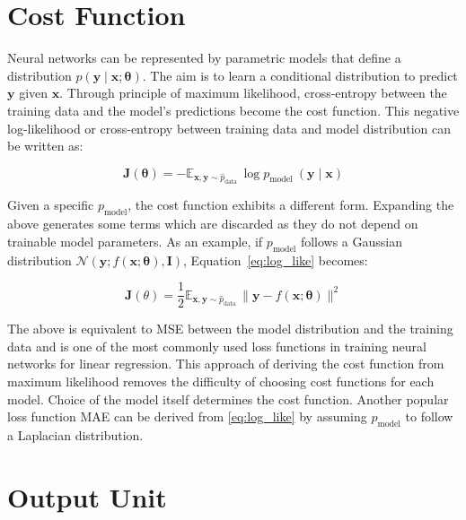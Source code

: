 \section{Cost Function}

Neural networks can be represented by parametric models that define a distribution $p(\boldsymbol{y} \mid \boldsymbol{x} ; \boldsymbol{\theta})$. The aim is to learn a conditional distribution to predict $\boldsymbol{y}$ given $\boldsymbol{x}$. Through principle of maximum likelihood, cross-entropy between the training data and the model's predictions become the cost function. This negative log-likelihood or cross-entropy between training data and model distribution can be written as:

\begin{equation}\label{eq:log_like}
\mathbf{J}(\boldsymbol{\theta})=-\mathbb{E}_{\mathbf{x}, \mathbf{y} \sim \hat{p}_{\text {data }}} \log p_{\text {model }}(\boldsymbol{y} \mid \boldsymbol{x})
\end{equation}

Given a specific $p_{\text {model}}$, the cost function exhibits a different form. Expanding the above generates some terms which are discarded as they do not depend on trainable model parameters. As an example, if $p_{\text {model}}$ follows a Gaussian distribution $\mathcal{N}(\boldsymbol{y} ; f(\boldsymbol{x} ; \boldsymbol{\theta}), \boldsymbol{I})$, Equation~\ref{eq:log_like} becomes:

\begin{equation}
\mathbf{J}(\theta)=\frac{1}{2} \mathbb{E}_{\mathbf{x}, \mathbf{y} \sim \hat{p}_{\text {data }}}\|\boldsymbol{y}-f(\boldsymbol{x} ; \boldsymbol{\theta})\|^{2}
\end{equation}

The above is equivalent to \ac{MSE} between the model distribution and the training data and is one of the most commonly used loss functions in training neural networks for linear regression. This approach of deriving the cost function from maximum likelihood removes the difficulty of choosing cost functions for each model. Choice of the model itself determines the cost function. Another popular loss function \ac{MAE} can be derived from \ref{eq:log_like} by assuming $p_{\text {model}}$ to follow a Laplacian distribution. 

\section{Output Unit}

